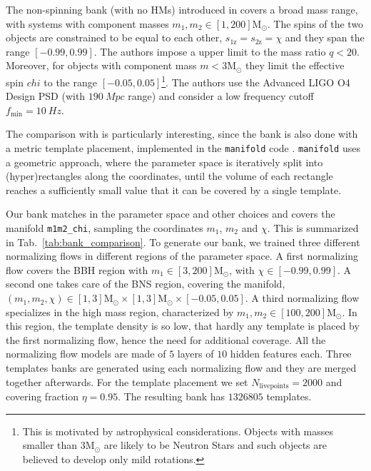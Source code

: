 \documentclass[twocolumn,showpacs,preprintnumbers,nofootinbib,prd,
superscriptaddress,10pt]{revtex4-2}
\begin{document}
The non-spinning bank (with no HMs) introduced in \cite{Sakon:2022ibh} covers a broad mass range, with systems with component masses $m_1, m_2 \in [1,200] \mathrm{M_\odot}$. The spins of the two objects are constrained to be equal to each other, $s_\text{1z} = s_\text{2z} = \chi$ and they span the range $[-0.99, 0.99]$.
The authors impose a upper limit to the mass ratio $q<20$. Moreover, for objects with component mass $m<3  \mathrm{M_\odot}$ they limit the effective spin $chi$ to the range $[-0.05, 0.05]$\footnote{This is motivated by astrophysical considerations. Objects with masses smaller than $3  \mathrm{M_\odot}$ are likely to be Neutron Stars and such objects are believed to develop only mild rotations.}.
The authors use the Advanced LIGO O4 Design PSD (with $\SI{190}{Mpc}$ range) \cite{O4_PSDs} and consider a low frequency cutoff $f_\text{min} = \SI{10}{Hz}$.

The comparison with \cite{Sakon:2022ibh} is particularly interesting, since the bank is also done with a metric template placement, implemented in the \texttt{manifold} code \cite{Hanna:2022zpk}. \texttt{manifold} uses a geometric approach, where the parameter space is iteratively split into (hyper)rectangles along the coordinates, until the volume of each rectangle reaches a sufficiently small value that it can be covered by a single template.

Our bank matches \cite{Sakon:2022ibh} in the parameter space and other choices and covers the manifold \texttt{m1m2\_chi}, sampling the coordinates $m_1$, $m_2$ and $\chi$. This is summarized in Tab.~\ref{tab:bank_comparison}.
To generate our bank, we trained three different normalizing flows in different regions of the parameter space. A first normalizing flow covers the BBH region with $m_1 \in [3,200] \mathrm{M_\odot}$, with $\chi \in [-0.99, 0.99]$. A second one takes care of the BNS region, covering the manifold, ${(m_1, m_2, \chi) \in [1,3]\mathrm{M_\odot}\times[1,3]\mathrm{M_\odot}\times [-0.05, 0.05]}$.
A third normalizing flow specializes in the high mass region, characterized by $m_1, m_2 \in [100,200] \mathrm{M_\odot}$. In this region, the template density is so low, that hardly any template is placed by the first normalizing flow, hence the need for additional coverage.
All the normalizing flow models are made of $5$ layers of $10$ hidden features each.
Three templates banks are generated using each normalizing flow and they are merged together afterwards.
For the template placement we set $N_\text{livepoints} = 2000$ and covering fraction $\eta = 0.95$.
The resulting bank has $1326805$ templates.
\end{document}
